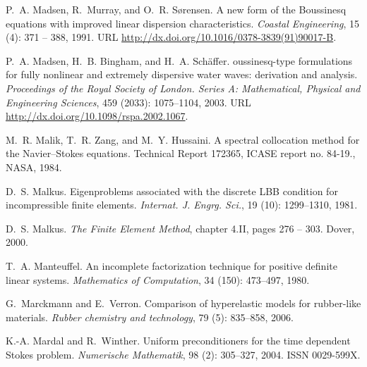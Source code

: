 \begin{thebibliography}{467}
P.~A. Madsen, R.~Murray, and O.~R. S{\o}rensen.
\newblock A new form of the {B}oussinesq equations with improved linear
  dispersion characteristics.
\newblock \emph{Coastal Engineering}, 15 (4): 371 -- 388,
  1991.
\newblock URL \url{http://dx.doi.org/10.1016/0378-3839(91)90017-B}.

P.~A. Madsen, H.~B. Bingham, and H.~A. Sch{\"a}ffer.
oussinesq-type formulations for fully nonlinear and extremely
  dispersive water waves: derivation and analysis.
\newblock \emph{Proceedings of the Royal Society of London. Series A:
  Mathematical, Physical and Engineering Sciences}, 459
  (2033): 1075--1104, 2003.
\newblock URL \url{http://dx.doi.org/10.1098/rspa.2002.1067}.

M.~R. Malik, T.~R. Zang, and M.~Y. Hussaini.
\newblock A spectral collocation method for the {N}avier--{S}tokes equations.
\newblock Technical Report 172365, ICASE report no. 84-19., NASA, 1984.

D.~S. Malkus.
\newblock Eigenproblems associated with the discrete {LBB} condition for
  incompressible finite elements.
\newblock \emph{Internat. J. Engrg. Sci.}, 19 (10):
  1299--1310, 1981.

D.~S. Malkus.
\newblock \emph{The Finite Element Method}, chapter 4.II, pages 276 -- 303.
\newblock Dover, 2000.

T.~A. Manteuffel.
\newblock An incomplete factorization technique for positive definite linear
  systems.
\newblock \emph{Mathematics of Computation}, 34 (150):
  473--497, 1980.

G.~Marckmann and E.~Verron.
\newblock Comparison of hyperelastic models for rubber-like materials.
\newblock \emph{Rubber chemistry and technology}, 79 (5):
  835--858, 2006.

K.-A. Mardal and R.~Winther.
\newblock Uniform preconditioners for the time dependent {S}tokes problem.
\newblock \emph{Numerische Mathematik}, 98 (2): 305--327,
  2004.
\newblock ISSN 0029-599X.


\end{thebibliography}
